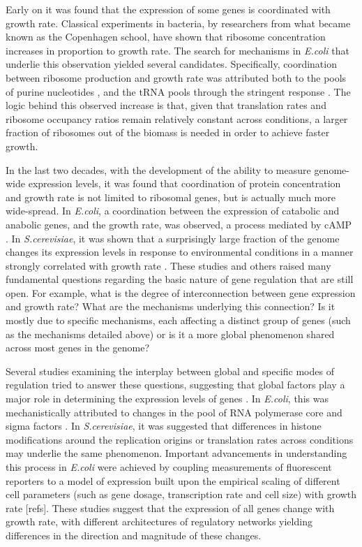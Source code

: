 \documentclass[notitlepage]{article}
\begin{document}
Early on it was found that the expression of some genes is coordinated with growth rate.
Classical experiments in bacteria, by researchers from what became known as the Copenhagen school, have shown that ribosome concentration increases in proportion to growth rate\parencite{Schaechter1958}.
The search for mechanisms in \emph{E.coli} that underlie this observation yielded several candidates.
Specifically, coordination between ribosome production and growth rate was attributed both to the pools of purine nucleotides \parencite{Gourse1996,Gaal1997}, and the tRNA pools through the stringent response \parencite{Chatterji2001,Brauer2008a}.
The logic behind this observed increase is that, given that translation rates and ribosome occupancy ratios remain relatively constant across conditions, a larger fraction of ribosomes out of the biomass is needed in order to achieve faster growth.

In the last two decades, with the development of the ability to measure genome-wide expression levels, it was found that coordination of protein concentration and growth rate is not limited to ribosomal genes, but is actually much more wide-spread.
In \emph{E.coli}, a coordination between the expression of catabolic and anabolic genes, and the growth rate, was observed, a process mediated by cAMP \parencite{Saldanha2004}.
In \emph{S.cerevisiae}, it was shown that a surprisingly large fraction of the genome changes its expression levels in response to environmental conditions in a manner strongly correlated with growth rate \parencite{Keren2013a,Gasch2000,Castrillo2007, Zaslaver2009a, Berthoumieux2013, Gerosa2013}.
These studies and others raised many fundamental questions regarding the basic nature of gene regulation that are still open.
For example, what is the degree of interconnection between gene expression and growth rate? What are the mechanisms underlying this connection? Is it mostly due to specific mechanisms, each affecting a distinct group of genes (such as the mechanisms detailed above) or is it a more global phenomenon shared across most genes in the genome?

Several studies examining the interplay between global and specific modes of regulation tried to answer these questions, suggesting that global factors play a major role in determining the expression levels of genes \parencite{Gasch2000, Klumpp2009a,Scott2010}.
In \emph{E.coli}, this was mechanistically attributed to changes in the pool of RNA polymerase core and sigma factors \parencite{Klumpp2008}.
In \emph{S.cerevisiae}, it was suggested that differences in histone modifications around the replication origins \parencite{regenberg2006} or translation rates \parencite{Gasch2000} across conditions may underlie the same phenomenon.
Important advancements in understanding this process in \emph{E.coli} were achieved by coupling measurements of fluorescent reporters to a model of expression built upon the empirical scaling of different cell parameters (such as gene dosage, transcription rate and cell size) with growth rate [refs].
These studies suggest that the expression of all genes change with growth rate, with different architectures of regulatory networks yielding differences in the direction and magnitude of these changes. 
\end{document}
